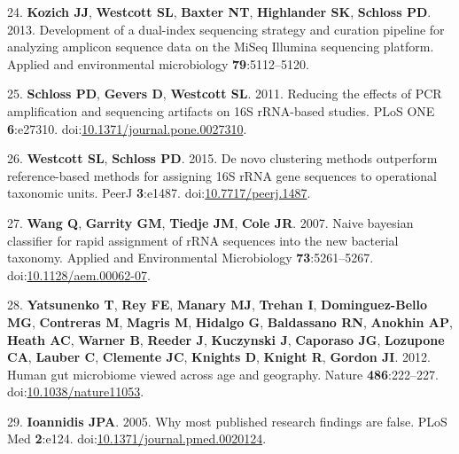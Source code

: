 \documentclass[12pt,]{article}
\begin{document}
\hypertarget{ref-Kozichux5f2013}{}
24. \textbf{Kozich JJ}, \textbf{Westcott SL}, \textbf{Baxter NT},
\textbf{Highlander SK}, \textbf{Schloss PD}. 2013. Development of a
dual-index sequencing strategy and curation pipeline for analyzing
amplicon sequence data on the MiSeq Illumina sequencing platform.
Applied and environmental microbiology \textbf{79}:5112--5120.

\hypertarget{ref-Schloss2011}{}
25. \textbf{Schloss PD}, \textbf{Gevers D}, \textbf{Westcott SL}. 2011.
Reducing the effects of PCR amplification and sequencing artifacts on
16S rRNA-based studies. PLoS ONE \textbf{6}:e27310.
doi:\href{https://doi.org/10.1371/journal.pone.0027310}{10.1371/journal.pone.0027310}.

\hypertarget{ref-Westcott2015}{}
26. \textbf{Westcott SL}, \textbf{Schloss PD}. 2015. De novo clustering
methods outperform reference-based methods for assigning 16S rRNA gene
sequences to operational taxonomic units. PeerJ \textbf{3}:e1487.
doi:\href{https://doi.org/10.7717/peerj.1487}{10.7717/peerj.1487}.

\hypertarget{ref-Wang2007}{}
27. \textbf{Wang Q}, \textbf{Garrity GM}, \textbf{Tiedje JM},
\textbf{Cole JR}. 2007. Naive bayesian classifier for rapid assignment
of rRNA sequences into the new bacterial taxonomy. Applied and
Environmental Microbiology \textbf{73}:5261--5267.
doi:\href{https://doi.org/10.1128/aem.00062-07}{10.1128/aem.00062-07}.

\hypertarget{ref-yatsunenkoux5fhumanux5f2012}{}
28. \textbf{Yatsunenko T}, \textbf{Rey FE}, \textbf{Manary MJ},
\textbf{Trehan I}, \textbf{Dominguez-Bello MG}, \textbf{Contreras M},
\textbf{Magris M}, \textbf{Hidalgo G}, \textbf{Baldassano RN},
\textbf{Anokhin AP}, \textbf{Heath AC}, \textbf{Warner B},
\textbf{Reeder J}, \textbf{Kuczynski J}, \textbf{Caporaso JG},
\textbf{Lozupone CA}, \textbf{Lauber C}, \textbf{Clemente JC},
\textbf{Knights D}, \textbf{Knight R}, \textbf{Gordon JI}. 2012. Human
gut microbiome viewed across age and geography. Nature
\textbf{486}:222--227.
doi:\href{https://doi.org/10.1038/nature11053}{10.1038/nature11053}.

\hypertarget{ref-Ioannidis2005}{}
29. \textbf{Ioannidis JPA}. 2005. Why most published research findings
are false. PLoS Med \textbf{2}:e124.
doi:\href{https://doi.org/10.1371/journal.pmed.0020124}{10.1371/journal.pmed.0020124}.
\end{document}

